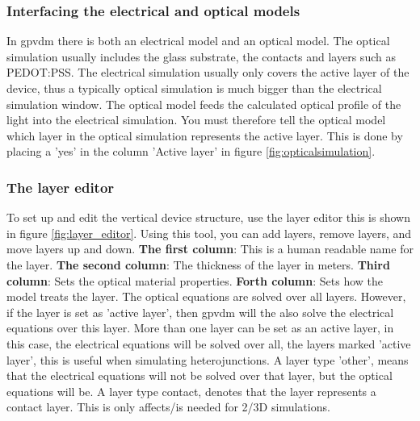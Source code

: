 \documentclass[11pt]{article}
\begin{document}
\subsubsection{Interfacing the electrical and optical models}
In gpvdm there is both an electrical model and an optical model.  The optical simulation usually includes the glass substrate, the contacts and layers such as PEDOT:PSS.  The electrical simulation usually only covers the active layer of the device, thus a typically optical simulation is much bigger than the electrical simulation window.  The optical model feeds the calculated optical profile of the light into the electrical simulation.  You must therefore tell the optical model which layer in the optical simulation represents the active layer.  This is done by placing a 'yes' in the column 'Active layer' in figure \ref{fig:opticalsimulation}.
\newpage
\vfill

\subsubsection{The layer editor}
To set up and edit the vertical device structure, use the layer editor this is shown in figure \ref{fig:layer_editor}. Using this tool, you can add layers, remove layers, and move layers up and down.
\linebreak
\linebreak 
\textbf{The first column}: This is a human readable name for the layer.
\linebreak 
\linebreak 
\textbf{The second column}: The thickness of the layer in meters.
\linebreak
\linebreak 
\textbf{Third column}: Sets the optical material properties.
\linebreak
\linebreak 
\textbf{Forth column}: Sets how the model treats the layer.  The optical equations are solved over all layers.  However, if the layer is set as 'active layer', then gpvdm will the also solve the electrical equations over this layer.  More than one layer can be set as an active layer, in this case, the electrical equations will be solved over all, the layers marked 'active layer', this is useful when simulating heterojunctions.  A layer type 'other', means that the electrical equations will not be solved over that layer, but the optical equations will be.  A layer type contact, denotes that the layer represents a contact layer.  This is only affects/is needed for 2/3D simulations.
\end{document}
